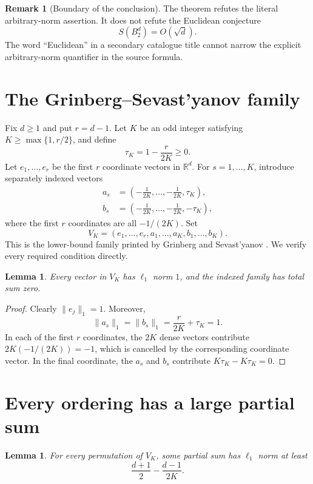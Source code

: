 \documentclass[10pt,reqno]{amsart}
\newtheorem{lemma}[theorem]{Lemma}
\theoremstyle{definition}
\newtheorem{remark}[theorem]{Remark}
\begin{document}
\begin{remark}[Boundary of the conclusion]\label{rem:scope}
The theorem refutes the literal arbitrary-norm assertion. It does not refute the Euclidean conjecture
\[
  S(B_2^d)=O(\sqrt d).
\]
The word ``Euclidean'' in a secondary catalogue title cannot narrow the explicit arbitrary-norm quantifier in the source formula.
\end{remark}

\section{The Grinberg--Sevast'yanov family}

Fix $d\geq1$ and put $r=d-1$. Let $K$ be an odd integer satisfying $K\geq\max\{1,r/2\}$, and define
\[
  \tau_K=1-\frac{r}{2K}\geq0.
\]
Let $e_1,\ldots,e_r$ be the first $r$ coordinate vectors in $\mathbb R^d$. For $s=1,\ldots,K$, introduce separately indexed vectors
\begin{align*}
  a_s&=\left(-\frac1{2K},\ldots,-\frac1{2K},\tau_K\right),\\
  b_s&=\left(-\frac1{2K},\ldots,-\frac1{2K},-\tau_K\right),
\end{align*}
where the first $r$ coordinates are all $-1/(2K)$. Set
\[
  V_K=(e_1,\ldots,e_r,a_1,\ldots,a_K,b_1,\ldots,b_K).
\]
This is the lower-bound family printed by Grinberg and Sevast'yanov \cite{GrinbergSevastyanov}. We verify every required condition directly.

\begin{lemma}\label{lem:unit-zero}
Every vector in $V_K$ has $\ell_1$ norm $1$, and the indexed family has total sum zero.
\end{lemma}

\begin{proof}
Clearly $\|e_j\|_1=1$. Moreover,
\[
  \|a_s\|_1=\|b_s\|_1=\frac{r}{2K}+\tau_K=1.
\]
In each of the first $r$ coordinates, the $2K$ dense vectors contribute $2K(-1/(2K))=-1$, which is cancelled by the corresponding coordinate vector. In the final coordinate, the $a_s$ and $b_s$ contribute $K\tau_K-K\tau_K=0$.
\end{proof}

\section{Every ordering has a large partial sum}

\begin{lemma}\label{lem:prefix}
For every permutation of $V_K$, some partial sum has $\ell_1$ norm at least
\[
  \frac{d+1}{2}-\frac{d-1}{2K}.
\]
\end{lemma}
\end{document}
